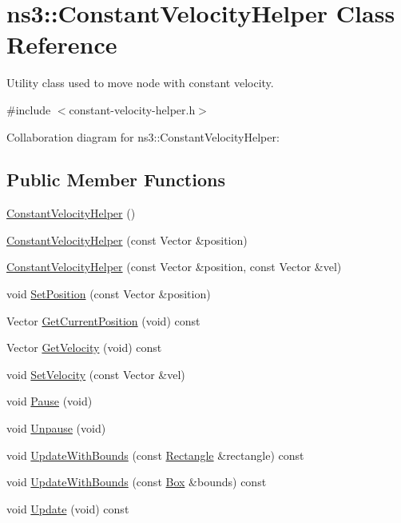 \hypertarget{classns3_1_1ConstantVelocityHelper}{}\section{ns3\+:\+:Constant\+Velocity\+Helper Class Reference}
\label{classns3_1_1ConstantVelocityHelper}


Utility class used to move node with constant velocity.  




{\ttfamily \#include $<$constant-\/velocity-\/helper.\+h$>$}



Collaboration diagram for ns3\+:\+:Constant\+Velocity\+Helper\+:
\subsection*{Public Member Functions}
\begin{DoxyCompactItemize}
\item 
\hyperlink{classns3_1_1ConstantVelocityHelper_a020bfd83b19253bb18253500aa207903}{Constant\+Velocity\+Helper} ()
\item 
\hyperlink{classns3_1_1ConstantVelocityHelper_adcc67a7bd882c3ef8f2bf845b98c41a5}{Constant\+Velocity\+Helper} (const Vector \&position)
\item 
\hyperlink{classns3_1_1ConstantVelocityHelper_a810c1893ad9899e7ed4966c9649144a3}{Constant\+Velocity\+Helper} (const Vector \&position, const Vector \&vel)
\item 
void \hyperlink{classns3_1_1ConstantVelocityHelper_a892b4b9ba9a1fbf4f8c221eae6a35cb9}{Set\+Position} (const Vector \&position)
\item 
Vector \hyperlink{classns3_1_1ConstantVelocityHelper_a9416fca612f00cca9fc9f453cad734b6}{Get\+Current\+Position} (void) const 
\item 
Vector \hyperlink{classns3_1_1ConstantVelocityHelper_aa38dd5be77680154c481e71f4965ae90}{Get\+Velocity} (void) const 
\item 
void \hyperlink{classns3_1_1ConstantVelocityHelper_a985ce86c5b3c94c43048f8db314bbb51}{Set\+Velocity} (const Vector \&vel)
\item 
void \hyperlink{classns3_1_1ConstantVelocityHelper_a90668d4ba75783657fb4dab7fe098740}{Pause} (void)
\item 
void \hyperlink{classns3_1_1ConstantVelocityHelper_a053e3968696019359f50d2b2739f783a}{Unpause} (void)
\item 
void \hyperlink{classns3_1_1ConstantVelocityHelper_aa09465916325b3f74e1c3361514aa0e7}{Update\+With\+Bounds} (const \hyperlink{classns3_1_1Rectangle}{Rectangle} \&rectangle) const 
\item 
void \hyperlink{classns3_1_1ConstantVelocityHelper_af9fe03587fb2c8cdb534c15f24a5ea1d}{Update\+With\+Bounds} (const \hyperlink{classns3_1_1Box}{Box} \&bounds) const 
\item 
void \hyperlink{classns3_1_1ConstantVelocityHelper_aaec113a6c2bae2bf8834bfb1e88d6192}{Update} (void) const 
\end{DoxyCompactItemize}
